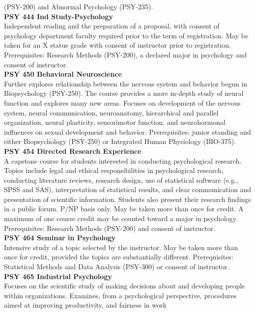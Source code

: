 \documentclass[
  letterpaper,
]{scrbook}
\begin{document}
(PSY-200) and Abnormal Psychology (PSY-235).\\
\textbf{PSY 444 Ind Study-Psychology}\\
Independent reading and the preparation of a proposal, with consent of
psychology department faculty required prior to the term of
registration. May be taken for an X status grade with consent of
instructor prior to registration. Prerequisites: Research Methods
(PSY-200), a declared major in psychology and consent of instructor.\\
\textbf{PSY 450 Behavioral Neuroscience}\\
Further explores relationship between the nervous system and behavior
begun in Biopsychology (PSY-250). The course provides a more in-depth
study of neural function and explores many new areas. Focuses on
development of the nervous system, neural communication, neuroanatomy,
hierarchical and parallel organization, neural plasticity, sensorimotor
function, and neurohormonal influences on sexual development and
behavior. Prerequisites: junior standing and either Biopsychology
(PSY-250) or Integrated Human Physiology (BIO-375).\\
\textbf{PSY 454 Directed Research Experience}\\
A capstone course for students interested in conducting psychological
research. Topics include legal and ethical responsibilities in
psychological research, conducting literature reviews, research design,
use of statistical software (e.g., SPSS and SAS), interpretation of
statistical results, and clear communication and presentation of
scientific information. Students also present their research findings in
a public forum. P/NP basis only. May be taken more than once for credit.
A maximum of one course credit may be counted toward a major in
psychology. Prerequisites: Research Methods (PSY-200) and consent of
instructor.\\
\textbf{PSY 464 Seminar in Psychology}\\
Intensive study of a topic selected by the instructor. May be taken more
than once for credit, provided the topics are substantially different.
Prerequisites: Statistical Methods and Data Analysis (PSY-300) or
consent of instructor.\\
\textbf{PSY 465 Industrial Psychology}\\
Focuses on the scientific study of making decisions about and developing
people within organizations. Examines, from a psychological perspective,
procedures aimed at improving productivity, and fairness in work
\end{document}
